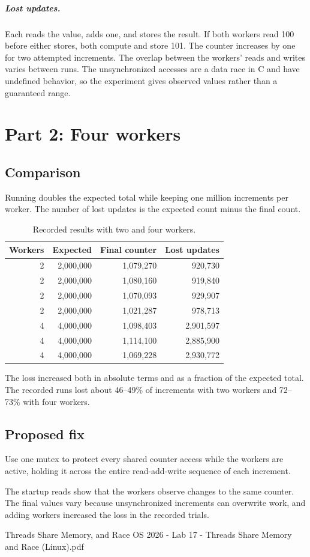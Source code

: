 \documentclass{../latex/utmreport}
\begin{document}
\paragraph{Lost updates.}
Each  reads the value, adds one, and stores the result. If both workers read 100 before either stores, both compute and store 101. The counter increases by one for two attempted increments. The overlap between the workers' reads and writes varies between runs. The unsynchronized accesses are a data race in C and have undefined behavior, so the experiment gives observed values rather than a guaranteed range.

\chapter{Part 2: Four workers}

\section{Comparison}
Running  doubles the expected total while keeping one million increments per worker. The number of lost updates is the expected count minus the final count.

\begin{table}[H]
\centering
\caption{Recorded results with two and four workers.}
\begin{tabular}{r r r r}
\hline
Workers & Expected & Final counter & Lost updates \\
\hline
2 & 2,000,000 & 1,079,270 & 920,730 \\
2 & 2,000,000 & 1,080,160 & 919,840 \\
2 & 2,000,000 & 1,070,093 & 929,907 \\
2 & 2,000,000 & 1,021,287 & 978,713 \\
4 & 4,000,000 & 1,098,403 & 2,901,597 \\
4 & 4,000,000 & 1,114,100 & 2,885,900 \\
4 & 4,000,000 & 1,069,228 & 2,930,772 \\
\hline
\end{tabular}
\end{table}

The loss increased both in absolute terms and as a fraction of the expected total. The recorded runs lost about 46--49\% of increments with two workers and 72--73\% with four workers.

\section{Proposed fix}
Use one mutex to protect every shared counter access while the workers are active, holding it across the entire read-add-write sequence of each increment.

\utmconclusions
The startup reads show that the workers observe changes to the same counter. The final values vary because unsynchronized increments can overwrite work, and adding workers increased the loss in the recorded trials.

\reportreferences
  {Threads Share Memory, and Race}
  {OS 2026 - Lab 17 - Threads Share Memory and Race (Linux).pdf}
\end{document}
